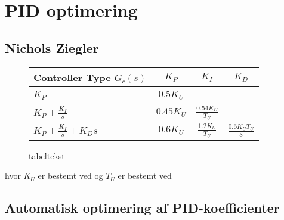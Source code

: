 \section{PID optimering}
\label{sec:PID}
\subsection{Nichols Ziegler}


\begin{figure}[th!]
\centering
\begin{tabular}{l|c|c|c}
Controller Type \({ G }_{ c }\left( s \right)\) & \(K_P\) & \(K_I\) & \(K_D\)\\\hline
\({ K }_{ P } \)& \(0.5  { K }_{ U }\) &-&-\\
\({ K }_{ P }+\frac { { K }_{ I } }{ s } \) & \(0.45  { K }_{ U }\) & \( \frac { 0.54  { K }_{ U } }{ { T }_{ U } }  \) &-\\
\({ K }_{ P }+\frac { { K }_{ I } }{ s } +{ K }_{ D }   s\) & \(0.6  { K }_{ U } \) &  \( \frac { 1.2  { K }_{ U } }{ { T }_{ U } }  \) & \(\frac { 0.6  { K }_{ U }  { T }_{ U } }{ 8 }  \)
\end{tabular}
\captionsetup{type=table}
\caption[tekst i indholdsfortegnelsen]{tabeltekst}
\label{tb:}
\end{figure}

hvor \(K_U\) er bestemt ved og \(T_U\) er bestemt ved





\subsection{Automatisk optimering af PID-koefficienter}